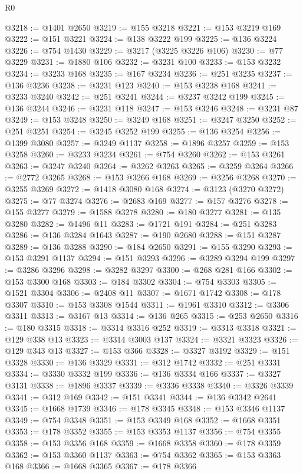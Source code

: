 \begin{lexlean}{R0}
\begin{coremodule}
@3218 := @1401 @2650
@3219 := @155 @3218
@3221 := @153 @3219 @169
@3222 := @151 @3221
@3224 := @138 @3222 @199
@3225 := @136 @3224
@3226 := @754 @1430
@3229 := @3217 (@3225 @3226 @106)
@3230 := @77 @3229
@3231 := @1880 @106
@3232 := @3231 @100
@3233 := @153 @3232
@3234 := @3233 @168
@3235 := @167 @3234
@3236 := @251 @3235
@3237 := @136 @3236
@3238 := @3231 @123
@3240 := @153 @3238 @168
@3241 := @3233 @3240
@3242 := @251 @3241
@3244 := @3237 @3242 @199
@3245 := @136 @3244
@3246 := @3231 @118
@3247 := @153 @3246
@3248 := @3231 @87
@3249 := @153 @3248
@3250 := @3249 @168
@3251 := @3247 @3250
@3252 := @251 @3251
@3254 := @3245 @3252 @199
@3255 := @136 @3254
@3256 := @1399 @3080
@3257 := @3249 @1137
@3258 := @1896 @3257
@3259 := @153 @3258
@3260 := @3233 @3234
@3261 := @754 @3260
@3262 := @153 @3261
@3263 := @3247 @3240
@3264 := @3262 @3263
@3265 := @3259 @3264
@3266 := @2772 @3265
@3268 := @153 @3266 @168
@3269 := @3256 @3268
@3270 := @3255 @3269
@3272 := @1418 @3080 @168
@3274 := @3123 (@3270 @3272)
@3275 := @77 @3274
@3276 := @2683 @169
@3277 := @157 @3276
@3278 := @155 @3277
@3279 := @1588 @3278
@3280 := @180 @3277
@3281 := @135 @3280
@3282 := @1496 @11
@3283 := @1721 @191
@3284 := @251 @3283
@3286 := @136 @3284 @1643
@3287 := @190 @2680
@3288 := @151 @3287
@3289 := @136 @3288
@3290 := @184 @2650
@3291 := @155 @3290
@3293 := @153 @3291 @1137
@3294 := @151 @3293
@3296 := @3289 @3294 @199
@3297 := @3286 @3296
@3298 := @3282 @3297
@3300 := @268 @281 @166
@3302 := @153 @3300 @168
@3303 := @184 @3302
@3304 := @754 @3303
@3305 := @1521 @3304
@3306 := @2408 @11
@3307 := @1671 @1742
@3308 := @178 @3307
@3310 := @153 @3308 @1544
@3311 := @1961 @3310
@3312 := @3306 @3311
@3313 := @3167 @13
@3314 := @136 @265
@3315 := @253 @2650
@3316 := @180 @3315
@3318 := @3314 @3316 @252
@3319 := @3313 @3318
@3321 := @129 @338 @13
@3323 := @3314 @3003 @137
@3324 := @3321 @3323
@3326 := @129 @343 @13
@3327 := @153 @366
@3328 := @3327 @3192
@3329 := @151 @3328
@3330 := @136 @3329
@3331 := @312 @1742
@3332 := @251 @3331
@3334 := @3330 @3332 @199
@3336 := @136 @3334 @166
@3337 := @3327 @3131
@3338 := @1896 @3337
@3339 := @3336 @3338
@3340 := @3326 @3339
@3341 := @312 @169
@3342 := @151 @3341
@3344 := @136 @3342 @2641
@3345 := @1668 @1739
@3346 := @178 @3345
@3348 := @153 @3346 @1137
@3349 := @754 @3348
@3351 := @153 @3349 @168
@3352 := @1668 @3351
@3353 := @178 @3352
@3355 := @153 @3353 @1137
@3356 := @754 @3355
@3358 := @153 @3356 @168
@3359 := @1668 @3358
@3360 := @178 @3359
@3362 := @153 @3360 @1137
@3363 := @754 @3362
@3365 := @153 @3363 @168
@3366 := @1668 @3365
@3367 := @178 @3366

\end{coremodule}
\end{lexlean}
